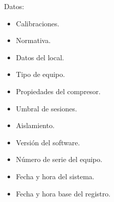 Datos:
\begin{multicols}{2}
	\begin{itemize}
	    \item Calibraciones.
	    \item Normativa.
	    \item Datos del local.
	    \item Tipo de equipo.
	    \item Propiedades del compresor.
	    \item Umbral de sesiones.
	    \item Aislamiento.
	    \item Versión del software.
	    \item Número de serie del equipo.
	    \item Fecha y hora del sistema.
	    \item Fecha y hora base del registro.
	\end{itemize}
\end{multicols}


